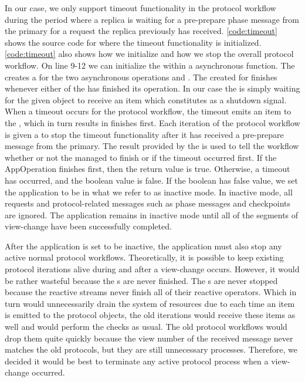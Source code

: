 In our case, we only support timeout functionality in the protocol workflow during the period where a replica is waiting for a pre-prepare phase message from the primary for a request the replica previously has received. \autoref{code:timeout} shows the source code for where the timeout functionality is initialized. \autoref{code:timeout} also shows how we initialize and how we stop the overall protocol workflow. On line 9-12 we can initialize the  within a  asynchronous function. The  creates a  for the two asynchronous  operations  and . The  created for  finishes whenever either of the  has finished its operation. In our case the  is simply waiting for the given  object  to receive an item which constitutes as a shutdown signal. When a timeout occurs for the protocol workflow, the timeout emits an item to the , which in turn results in  finishes first. Each iteration of the protocol workflow is given a  to stop the timeout functionality after it has received a pre-prepare message from the primary. The  result provided by the  is used to tell the workflow whether or not the  managed to finish or if the timeout occurred first. If the AppOperation finishes first, then the return value is true. Otherwise, a timeout has occurred, and the boolean value is false.  If the boolean has false value, we set the application to be in what we refer to as inactive mode. In inactive mode, all requests and protocol-related messages such as phase messages and checkpoints are ignored. The application remains in inactive mode until all of the segments of view-change have been successfully completed. 

After the application is set to be inactive, the application must also stop any active normal protocol workflows. Theoretically, it is possible to keep existing protocol iterations alive during and after a view-change occurs. However, it would be rather wasteful because the s are never finished. The s are never stopped because the reactive streams never finish all of their reactive operators. Which in turn would unnecessarily drain the system of resources due to each time an item is emitted to the protocol  objects, the old iterations would receive these items as well and would perform the checks as usual. The old protocol workflows would drop them quite quickly because the view number of the received message never matches the old protocols, but they are still unnecessary processes. Therefore, we decided it would be best to terminate any active protocol process when a view-change occurred. 

